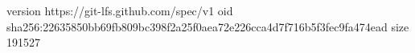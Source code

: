 version https://git-lfs.github.com/spec/v1
oid sha256:22635850bb69fb809bc398f2a25f0aea72e226cca4d7f716b5f3fec9fa474ead
size 191527
